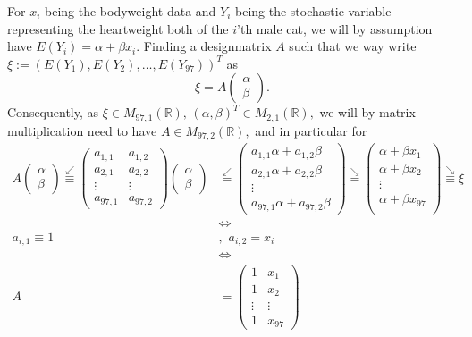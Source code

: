 \documentclass[
]{article}
\begin{document}
For \(x_i\) being the bodyweight data and \(Y_i\) being the stochastic
variable representing the heartweight both of the \(i\)'th male cat, we
will by assumption have \(E(Y_i)=\alpha + \beta x_i.\) Finding a
designmatrix \(A\) such that we way write
\(\xi:=\left({E(Y_1), E(Y_2), \ldots, E(Y_{97})}\right)^T\) as \[
\xi=A\begin{pmatrix}
\alpha\\
\beta
\end{pmatrix}.
\] Consequently, as
\(\xi\in M_{97,1}(\mathbb{R}),\,\left({\alpha, \beta}\right)^T\in M_{2,1}(\mathbb{R}),\)
we will by matrix multiplication need to have
\(A\in M_{97,2}(\mathbb{R}),\) and in particular for \begin{align*}
A\begin{pmatrix}
\alpha\\
\beta
\end{pmatrix}
\overset{\swarrow}{\equiv}
\begin{pmatrix}
a_{1,1} & a_{1,2} \\
a_{2,1} & a_{2,2} \\
\vdots & \vdots \\
a_{97,1} & a_{97,2}
\end{pmatrix}\begin{pmatrix}
\alpha\\
\beta
\end{pmatrix}&\overset{\swarrow}{=}
\begin{pmatrix}
a_{1,1}\alpha + a_{1,2}\beta \\
a_{2,1}\alpha + a_{2,2}\beta \\
\vdots \\
a_{97,1}\alpha+a_{97,2}\beta 
\end{pmatrix}\overset{\searrow}{=}\begin{pmatrix}
\alpha + \beta x_1 \\
\alpha + \beta x_2 \\
\vdots \\
\alpha + \beta x_{97} \\
\end{pmatrix}\overset{\searrow}{\equiv}\xi\\
&\Leftrightarrow\\
a_{i,1}\equiv 1&,\,\,a_{i,2}=x_i\\
&\Leftrightarrow\\
A&=\begin{pmatrix}
1 & x_1 \\
1 & x_2 \\
\vdots & \vdots \\
1 & x_{97}
\end{pmatrix}
\end{align*}
\end{document}

